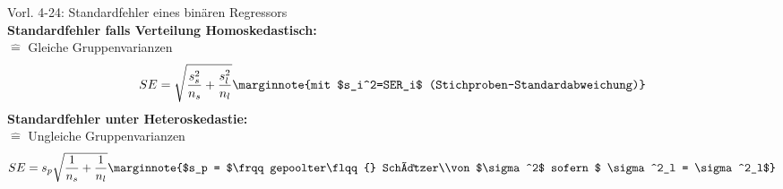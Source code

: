 Vorl. 4-24: Standardfehler eines binären Regressors\\

\noindent
{\bfseries Standardfehler falls Verteilung Homoskedastisch:}\\
$\hat{=}$ Gleiche Gruppenvarianzen
\begin{align*}
	SE = \sqrt{\frac{s_s^2}{n_s}+\frac{s_l^2}{n_l}}\marginnote{mit $s_i^2=SER_i$ (Stichproben-Standardabweichung)}
\end{align*}
{\bfseries Standardfehler unter Heteroskedastie:}\\
$\hat{=}$ Ungleiche Gruppenvarianzen
\begin{align*}
SE = s_p\sqrt{\frac{1}{n_s}+\frac{1}{n_l}}\marginnote{$s_p = $\frqq gepoolter\flqq{} Schätzer\\von  $\sigma^2$  sofern $ \sigma^2_l = \sigma^2_l$}
\end{align*}


